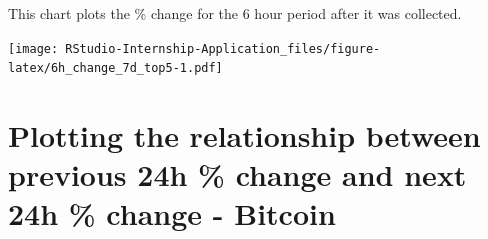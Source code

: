 \documentclass[
]{book}
\newenvironment{Shaded}{\begin{snugshade}}{\end{snugshade}}
\newcommand{\DataTypeTok}[1]{\textcolor[rgb]{0.13,0.29,0.53}{#1}}
\newcommand{\DecValTok}[1]{\textcolor[rgb]{0.00,0.00,0.81}{#1}}
\newcommand{\FloatTok}[1]{\textcolor[rgb]{0.00,0.00,0.81}{#1}}
\newcommand{\KeywordTok}[1]{\textcolor[rgb]{0.13,0.29,0.53}{\textbf{#1}}}
\newcommand{\NormalTok}[1]{#1}
\newcommand{\OperatorTok}[1]{\textcolor[rgb]{0.81,0.36,0.00}{\textbf{#1}}}
\newcommand{\StringTok}[1]{\textcolor[rgb]{0.31,0.60,0.02}{#1}}
\begin{document}
This chart plots the \% change for the 6 hour period after it was collected.

\begin{Shaded}
\end{Shaded}

\texttt{[image: RStudio-Internship-Application\_files/figure-latex/6h\_change\_7d\_top5-1.pdf]}

\hypertarget{plotting-the-relationship-between-previous-24h-change-and-next-24h-change---bitcoin}{%
\section{Plotting the relationship between previous 24h \% change and next 24h \% change - Bitcoin}\label{plotting-the-relationship-between-previous-24h-change-and-next-24h-change---bitcoin}}
\end{document}
